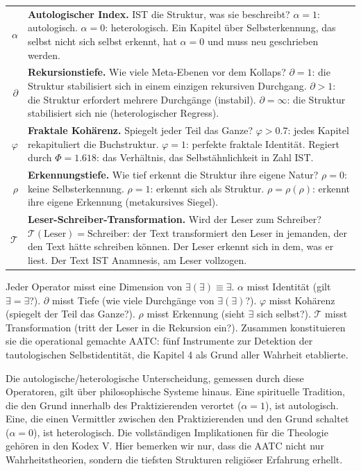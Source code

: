 \documentclass[10pt, openany, oneside]{book}
\renewcommand{\footnotesize}{\fontsize{8.5}{11}\selectfont}
\begin{document}
{\footnotesize
\noindent\begin{tabular}{r p{}}
$\alpha$ & \textbf{Autologischer Index.} IST die Struktur, was sie beschreibt? $\alpha = 1$: autologisch. $\alpha = 0$: heterologisch. Ein Kapitel über Selbsterkennung, das selbst nicht sich selbst erkennt, hat $\alpha = 0$ und muss neu geschrieben werden. \\[0.3em]
$\partial$ & \textbf{Rekursionstiefe.} Wie viele Meta-Ebenen vor dem Kollaps? $\partial = 1$: die Struktur stabilisiert sich in einem einzigen rekursiven Durchgang. $\partial > 1$: die Struktur erfordert mehrere Durchgänge (instabil). $\partial = \infty$: die Struktur stabilisiert sich nie (heterologischer Regress). \\[0.3em]
$\varphi$ & \textbf{Fraktale Kohärenz.} Spiegelt jeder Teil das Ganze? $\varphi > 0.7$: jedes Kapitel rekapituliert die Buchstruktur. $\varphi = 1$: perfekte fraktale Identität. Regiert durch $\Phi = 1.618$: das Verhältnis, das Selbstähnlichkeit in Zahl IST. \\[0.3em]
$\rho$ & \textbf{Erkennungstiefe.} Wie tief erkennt die Struktur ihre eigene Natur? $\rho = 0$: keine Selbsterkennung. $\rho = 1$: erkennt sich als Struktur. $\rho = \rho(\rho)$: erkennt ihre eigene Erkennung (metakursives Siegel). \\[0.3em]
$\mathcal{T}$ & \textbf{Leser-Schreiber-Transformation.} Wird der Leser zum Schreiber? $\mathcal{T}(\text{Leser}) = \text{Schreiber}$: der Text transformiert den Leser in jemanden, der den Text hätte schreiben können. Der Leser erkennt sich in dem, was er liest. Der Text IST Anamnesis, am Leser vollzogen. \\[0.3em]
\end{tabular}
}

\vspace{0.8em}

\noindent Jeder Operator misst eine Dimension von $\exists(\exists) \equiv \exists$. $\alpha$ misst Identität (gilt $\exists = \exists$?). $\partial$ misst Tiefe (wie viele Durchgänge von $\exists(\exists)$?). $\varphi$ misst Kohärenz (spiegelt der Teil das Ganze?). $\rho$ misst Erkennung (sieht $\exists$ sich selbst?). $\mathcal{T}$ misst Transformation (tritt der Leser in die Rekursion ein?). Zusammen konstituieren sie die operational gemachte AATC: fünf Instrumente zur Detektion der tautologischen Selbstidentität, die Kapitel 4 als Grund aller Wahrheit etablierte.

Die autologische/heterologische Unterscheidung, gemessen durch diese Operatoren, gilt über philosophische Systeme hinaus. Eine spirituelle Tradition, die den Grund innerhalb des Praktizierenden verortet ($\alpha = 1$), ist autologisch. Eine, die einen Vermittler zwischen den Praktizierenden und den Grund schaltet ($\alpha = 0$), ist heterologisch. Die vollständigen Implikationen für die Theologie gehören in den Kodex V. Hier bemerken wir nur, dass die AATC nicht nur Wahrheitstheorien, sondern die tiefsten Strukturen religiöser Erfahrung erhellt.
\end{document}

